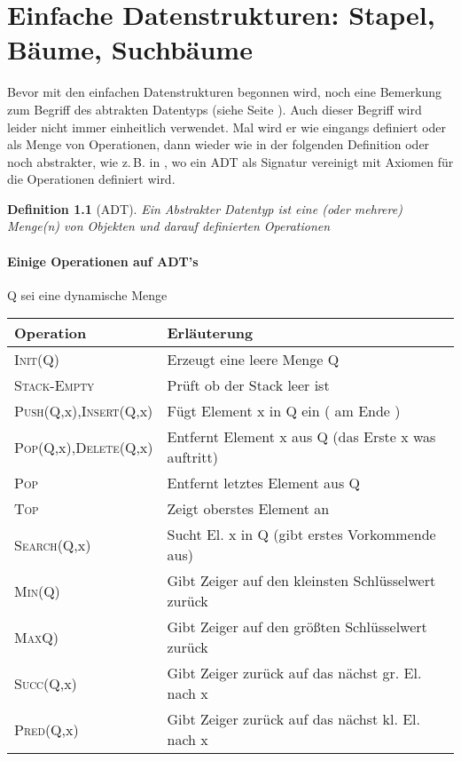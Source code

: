 \documentclass[ngerman,draft,parskip=half*,twoside]{scrreprt}
\theoremstyle{break}
\newtheorem{definition}{Definition}[chapter]
\theoremstyle{nonumberbreak}
\begin{document}
  \chapter{Einfache Datenstrukturen: Stapel, Bäume, Suchbäume}
  Bevor mit den einfachen Datenstrukturen begonnen wird,
  noch eine Bemerkung zum Begriff des abtrakten Datentyps (siehe Seite \pageref{ADT}).
  Auch dieser Begriff wird leider nicht immer einheitlich verwendet. Mal wird er wie eingangs definiert oder als Menge von Operationen,
  dann wieder wie in der
  folgenden Definition oder noch abstrakter, wie z.\,B. in \cite{guting}, wo ein ADT als Signatur vereinigt mit Axiomen für die
  Operationen definiert wird.

  \begin{definition}[ADT]
    Ein Abstrakter Datentyp ist eine (oder mehrere) Menge(n) von Objekten und
    darauf definierten Operationen
  \end{definition}

  \subsubsection{Einige Operationen auf ADT's}
  \begin{description}
  \item Q sei eine dynamische Menge
   
   \begin{tabular}[t]{@{}ll@{}} %
      Operation & Erläuterung \\
      \hline
      \textsc{Init}(Q) & Erzeugt eine leere Menge Q \\
      \textsc{Stack-Empty} & Prüft ob der Stack leer ist \\
      \textsc{Push}(Q,x),\textsc{Insert}(Q,x) & Fügt Element x in Q ein ( am Ende ) \\
      \textsc{Pop}(Q,x),\textsc{Delete}(Q,x) & Entfernt Element x aus Q (das Erste x was auftritt)\\
      \textsc{Pop} & Entfernt letztes Element aus Q\\
      \textsc{Top} & Zeigt oberstes Element an \\
      \textsc{Search}(Q,x) & Sucht El. x in Q (gibt erstes Vorkommende aus)\\
      \textsc{Min}(Q) & Gibt Zeiger auf den kleinsten Schlüsselwert zurück \\
      \textsc{Max}Q) & Gibt Zeiger auf den größten Schlüsselwert zurück \\
      \textsc{Succ}(Q,x) & Gibt Zeiger zurück auf das nächst gr. El. nach x\\
      \textsc{Pred}(Q,x) & Gibt Zeiger zurück auf das nächst kl. El. nach x 
   \end{tabular}
    
  \end{description}
\end{document}
